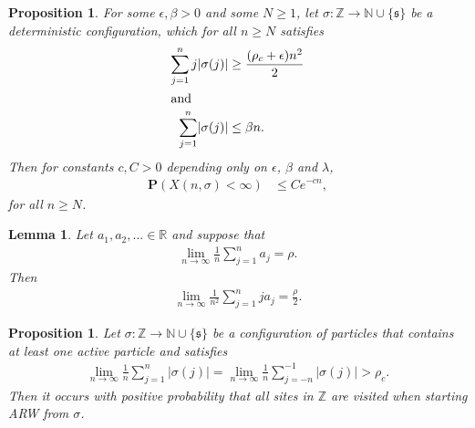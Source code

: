 \documentclass[10pt,a4paper]{amsart}
\newtheorem{lemma}[theorem]{Lemma}
\newtheorem{proposition}[theorem]{Proposition}
\begin{document}
\setcounter{section}{2}
\setcounter{equation}{0}
\setcounter{theorem}{2}
\begin{proposition}%
\label{prop:right.avalanche}
For some $\epsilon ,\beta >0$ and some $N\geq 1$, let
$\sigma \colon \mathbb{Z}\to \mathbb{N}\cup \{\mathfrak{s}\}$ be a deterministic
configuration, which for all $n \ge N$ satisfies
%
\begin{align}
\sum _{j=1}^{n} j\mathopen{\lvert }\sigma (j)\mathclose{\rvert } &\geq
\frac{(\rho _{c}+\epsilon )n^{2}}{2}
\label{eq:center.of.mass}
\\
\intertext{and} \sum _{j=1}^{n}\mathopen{\lvert }\sigma (j)\mathclose{\rvert }&\leq \beta n.
\label{eq:max.density}
\end{align}
%
Then for constants $c,C>0$ depending only on $\epsilon $, $\beta $ and
$\lambda $,
%
\begin{align*}
\mathbf{P}(X(n, \sigma )<\infty ) &\leq Ce^{-cn},
\end{align*}
%
for all $n \ge N$.
\end{proposition}

\setcounter{section}{2}
\setcounter{equation}{2}
\setcounter{theorem}{3}
\begin{lemma}%
\label{lem:averages}
Let $a_{1},a_{2},\ldots \in \mathbb{R}$ and suppose that
%
\begin{align}
\label{eq:erg}
\lim _{n\to \infty}\frac{1}{n}\sum _{j=1}^{n}a_{j}=\rho .
\end{align}
%
Then
%
\begin{align}
\label{eq:weighted}
\lim _{n\to \infty}\frac{1}{n^{2}}\sum _{j=1}^{n}ja_{j}=
\frac{\rho }{2}.
\end{align}
%
\end{lemma}

\setcounter{section}{2}
\setcounter{equation}{4}
\setcounter{theorem}{4}
\begin{proposition}%
\label{prop:det.explosive}
Let $\sigma \colon \mathbb{Z}\to \mathbb{N}\cup \{\mathfrak{s}\}$ be a
configuration of particles that contains at least one active particle and
satisfies
%
\begin{align}
\label{eq:det.explosive}
\lim _{n\to \infty}\frac {1} {n} \sum _{j=1}^{n}\mathopen{\lvert }\sigma (j)\mathclose{\rvert }=
\lim _{n\to \infty}\frac {1} {n} \sum _{j=-n}^{-1}\mathopen{\lvert }\sigma (j)\mathclose{\rvert }>
\rho _{c}.
\end{align}
%
Then it occurs with positive probability that all sites in
$\mathbb{Z}$ are visited when starting ARW from $\sigma $.
\end{proposition}
\end{document}
